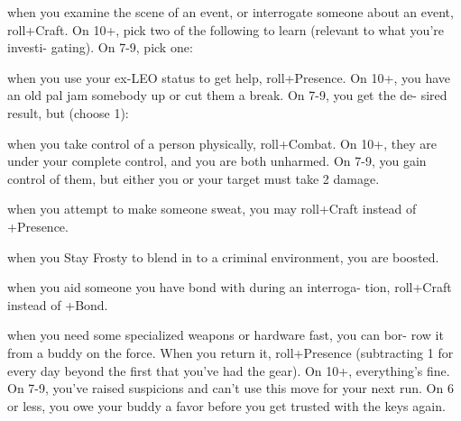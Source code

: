 \begin{dossier}
\hspace{.5cm}%
\vrule width 2pt
\hspace{.3cm}%
\begin{dossiermovebar}
\fontsize{9pt}{1em}\selectfont
\setlength{\parskip}{.05cm}


 when you examine the scene of an event, or interrogate someone about an
event, roll+Craft. On 10+, pick two of the following to learn (relevant to what you’re investi-
gating). On 7-9, pick one:
\begin{moveoptions}

\end{moveoptions}

 when you use your ex-LEO status to get help, roll+Presence. On
10+, you have an old pal jam somebody up or cut them a break. On 7-9, you get the de-
sired result, but (choose 1):
\begin{moveoptions}


\end{moveoptions}

 when you take control of a person physically, roll+Combat. On 10+, they
are under your complete control, and you are both unharmed. On 7-9, you gain control of
them, but either you or your target must take 2
damage.

 when you attempt to make someone sweat, you may roll+Craft instead
of +Presence.

 when you Stay Frosty to blend in to a criminal environment, you are
boosted.

 when you aid someone you have bond with during an interroga-
tion, roll+Craft instead of +Bond.

 when you need some specialized weapons or hardware fast, you can bor-
row it from a buddy on the force. When you return it, roll+Presence (subtracting 1 for every
day beyond the first that you’ve had the gear). On 10+, everything’s fine. On 7-9, you’ve
raised suspicions and can’t use this move for your next run. On 6 or less, you owe your
buddy a favor before you get trusted with the keys
again.


\end{dossiermovebar}
\end{dossier}

